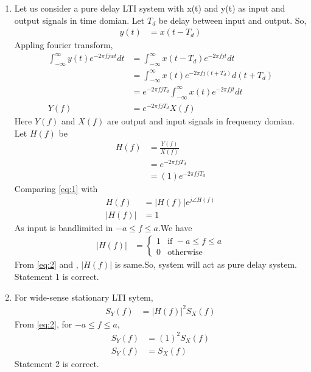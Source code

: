\documentclass[journal,12pt,twocolumn]{IEEEtran}
\theoremstyle{remark}
\begin{document}
\begin{enumerate}
\item Let us consider a pure delay LTI system with x(t) and y(t) as input and output signals in time domian. Let $T_d$ be delay between input and output. So,
\begin{align}
y(t)&=x(t-T_d)
\end{align}
Appling fourier transform,
\begin{align}
\int_{-\infty}^{\infty}y(t)e^{-2\pi fjwt}dt&=\int_{-\infty}^{\infty}x(t-T_d)e^{-2\pi fjt}dt\\
&=\int_{-\infty}^{\infty}x(t)e^{-2\pi fj(t+T_d)}d(t+T_d)\\
&=e^{-2\pi fjT_d}\int_{-\infty}^{\infty}x(t)e^{-2\pi fjt}dt\\
Y(f)&=e^{-2\pi fjT_d}X(f)
\end{align}
Here $Y(f)$ and $X(f)$ are output and input signals in frequency domian. Let $H(f)$ be 
\begin{align}
H(f)&=\frac{Y(f)}{X(f)}\\
&=e^{-2\pi fjT_d}\\
&=(1)e^{-2\pi fjT_d}
\label{eq:1}
\end{align}
Comparing \eqref{eq:1} with
\begin{align}
H(f)&=|H(f)|e^{j\angle H(f)}\\
|H(f)|&=1
\end{align}
As input is bandlimited in $-a\leq f \leq a$.We have
\begin{align}
|H(f)| &= 
        \begin{cases}
            1 & \text{if }-a \leq f \leq a\\
            0 & \text{otherwise}
        \end{cases}\label{eq:2}
\end{align}
From \eqref{eq:2} and , $|H(f)|$ is same.So, system will act as pure delay system. Statement 1 is correct.
\item For wide-sense stationary LTI sytem,
\begin{align}
S_Y(f)&=|H(f)|^2S_X(f)
\end{align}
From \eqref{eq:2}, for $-a \leq f \leq a$,
\begin{align}
S_Y(f)&=(1)^2S_X(f)\\
S_Y(f)&=S_X(f)
\end{align}
Statement 2 is correct.
\end{enumerate}
\end{document}
